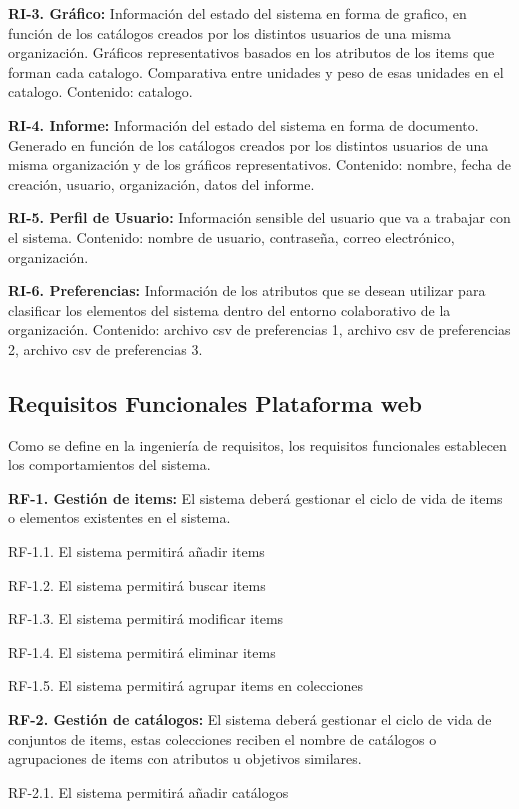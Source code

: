 \documentclass[a4paper,11pt]{book}
\begin{document}
\textbf{RI-3. Gráfico:} Información del estado del sistema en forma de grafico, en función de los catálogos creados por los distintos usuarios de una misma organización. Gráficos representativos basados en los atributos de los items que forman cada catalogo. Comparativa entre unidades y peso de esas unidades en el catalogo. 
Contenido: catalogo.

\textbf{RI-4. Informe:} Información del estado del sistema en forma de documento. Generado en función de los catálogos creados por los distintos usuarios de una misma organización y de los gráficos representativos. 
Contenido: nombre, fecha de creación, usuario, organización, datos del informe. 

\textbf{RI-5. Perfil de Usuario:} Información sensible del usuario que va a trabajar con el sistema. Contenido: nombre de usuario, contraseña, correo electrónico, organización. 

\textbf{RI-6. Preferencias:} Información de los atributos que se desean utilizar para clasificar los elementos del sistema dentro del entorno colaborativo de la organización.
Contenido: archivo csv de preferencias 1, archivo csv de preferencias 2, archivo csv de preferencias 3. 


\subsection{Requisitos Funcionales Plataforma web}

Como se define en la ingeniería de requisitos, los requisitos funcionales establecen los comportamientos del sistema.

\textbf{RF-1. Gestión de items:} El sistema deberá gestionar el ciclo de vida de items o elementos existentes en el sistema.
   

	RF-1.1. El sistema permitirá añadir items

	RF-1.2. El sistema permitirá buscar items

	RF-1.3. El sistema permitirá modificar items

	RF-1.4. El sistema permitirá eliminar items

	RF-1.5. El sistema permitirá agrupar items en colecciones


\textbf{RF-2. Gestión de catálogos:} El sistema deberá gestionar el ciclo de vida de conjuntos de items, estas colecciones reciben el nombre de catálogos o agrupaciones de items con atributos u objetivos similares.   


	RF-2.1. El sistema permitirá añadir catálogos
\end{document}
